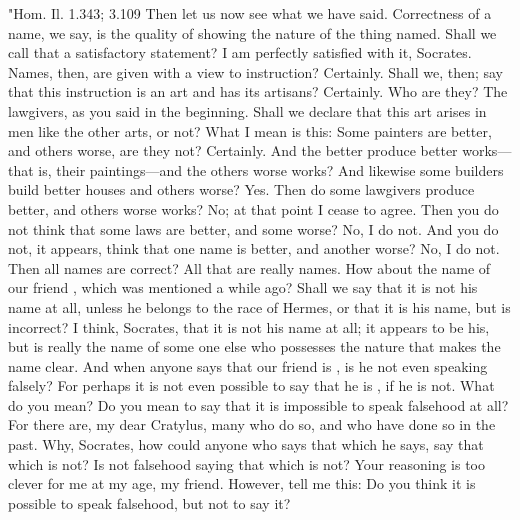 {{{{{"Hom. Il. 1.343; 3.109  Then let us now see what we have said. Correctness of a name, we say, is the quality of showing the nature of the thing named. Shall we call that a satisfactory statement?
\cratylusspeaks
I am perfectly satisfied with it, Socrates.
\socratesspeaks
Names, then, are given with a view to instruction?
\cratylusspeaks
Certainly.
\socratesspeaks
Shall we, then; say that this instruction is an art and has its artisans?
\cratylusspeaks
Certainly.
\socratesspeaks
Who are they? 
\cratylusspeaks
The lawgivers, as you said in the beginning.
\socratesspeaks
Shall we declare that this art arises in men like the other arts, or not? What I mean is this: Some painters are better, and others worse, are they not?
\cratylusspeaks
Certainly.
\socratesspeaks
And the better produce better works—that is, their paintings—and the others worse works? And likewise some builders build better houses and others worse?
\cratylusspeaks
Yes. 
\socratesspeaks
Then do some lawgivers produce better, and others worse works?
\cratylusspeaks
No; at that point I cease to agree.
\socratesspeaks
Then you do not think that some laws are better, and some worse?
\cratylusspeaks
No, I do not.
\socratesspeaks
And you do not, it appears, think that one name is better, and another worse?
\cratylusspeaks
No, I do not.
\socratesspeaks
Then all names are correct?
\cratylusspeaks
All that are really names.
\socratesspeaks
How about the name of our friend \hermogenesspeaks,  which was mentioned a while ago? Shall we say that it is not his name at all, unless he belongs to the race of Hermes, or that it is his name, but is incorrect?
\cratylusspeaks
I think, Socrates, that it is not his name at all; it appears to be his, but is really the name of some one else who possesses the nature that makes the name clear.
\socratesspeaks
And when anyone says that our friend is \hermogenesspeaks, is he not even speaking falsely? For perhaps it is not even possible to say that he is \hermogenesspeaks, if he is not.
\cratylusspeaks
What do you mean?
\socratesspeaks
Do you mean to say that it is impossible to speak falsehood at all?  For there are, my dear Cratylus, many who do so, and who have done so in the past.
\cratylusspeaks
Why, Socrates, how could anyone who says that which he says, say that which is not? Is not falsehood saying that which is not?
\socratesspeaks
Your reasoning is too clever for me at my age, my friend. However, tell me this: Do you think it is possible to speak falsehood,  but not to say it?
\cratylusspeaks
}}}}}
